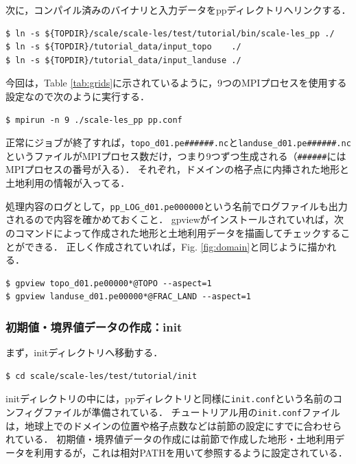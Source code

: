 次に，コンパイル済みのバイナリと入力データをppディレクトリへリンクする．

\begin{verbatim}
$ ln -s ${TOPDIR}/scale/scale-les/test/tutorial/bin/scale-les_pp ./
$ ln -s ${TOPDIR}/tutorial_data/input_topo    ./
$ ln -s ${TOPDIR}/tutorial_data/input_landuse ./
\end{verbatim}


今回は，Table \ref{tab:grids}に示されているように，9つのMPIプロセスを使用する設定なので次のように実行する．
\begin{verbatim}
$ mpirun -n 9 ./scale-les_pp pp.conf
\end{verbatim}

正常にジョブが終了すれば，\verb|topo_d01.pe######.nc|と\verb|landuse_d01.pe######.nc|というファイルがMPIプロセス数だけ，つまり9つずつ生成される（\verb|######|にはMPIプロセスの番号が入る）．
それぞれ，ドメインの格子点に内挿された地形と土地利用の情報が入ってる．

処理内容のログとして，\verb|pp_LOG_d01.pe000000|という名前でログファイルも出力されるので内容を確かめておくこと．
gpviewがインストールされていれば，次のコマンドによって作成された地形と土地利用データを描画してチェックすることができる．
正しく作成されていれば，Fig. \ref{fig:domain}と同じように描かれる．

\begin{verbatim}
$ gpview topo_d01.pe00000*@TOPO --aspect=1
$ gpview landuse_d01.pe00000*@FRAC_LAND --aspect=1
\end{verbatim}


\subsubsection{初期値・境界値データの作成：init}

まず，initディレクトリへ移動する．\\
\begin{verbatim}
$ cd scale/scale-les/test/tutorial/init
\end{verbatim}

initディレクトリの中には，ppディレクトリと同様に\verb|init.conf|という名前のコンフィグファイルが準備されている．
チュートリアル用の\verb|init.conf|ファイルは，地球上でのドメインの位置や格子点数などは前節の設定にすでに合わせられている．
初期値・境界値データの作成には前節で作成した地形・土地利用データを利用するが，これは相対PATHを用いて参照するように設定されている．


